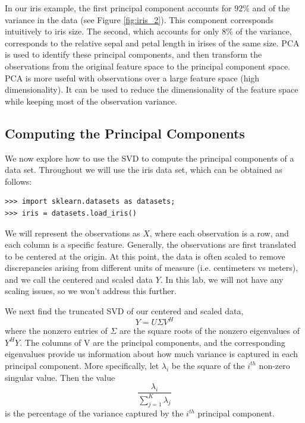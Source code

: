 In our iris example, the first principal component accounts for $92\%$ and of the variance in the data (see Figure \ref{fig:iris_2}). This component corresponds intuitively to iris size. The second, which accounts for only $8\%$ of the variance, corresponds to the relative sepal and petal length in irises of the same size. PCA is used to identify these principal components, and then transform the observations from the original feature space to the principal component space.
PCA is more useful with observations over a large feature space (high dimensionality). It can be used to reduce the dimensionality of the feature space while keeping most of the observation variance.

\subsection*{Computing the Principal Components}
We now explore how to use the SVD to compute the principal components of a data set.
Throughout we will use the iris data set, which can be obtained as follows:
\begin{lstlisting}
>>> import sklearn.datasets as datasets;
>>> iris = datasets.load_iris()
\end{lstlisting}
We will represent the observations as $X$, where each observation is a row, and each column is a specific feature. Generally, the observations are first translated to be centered at the origin. At this point, the data is often scaled to remove discrepancies arising from different units of measure (i.e. centimeters vs meters), and we call the centered and scaled data $Y$. In this lab, we will not have any scaling issues, so we won't address this further.

We next find the truncated SVD of our centered and scaled data,
\[Y = U\Sigma V^{H}\]
where the nonzero entries of $\Sigma$ are the square roots of the nonzero eigenvalues of $Y^{H}Y$. The columns of V are the principal components, and the corresponding eigenvalues provide us information about how much variance is captured in each principal component. More specifically, let $\lambda_{i}$ be the square of the $i^{th}$ non-zero singular value. Then the value
\[\frac{\lambda_{i}}{\sum_{j=1}^{K} \lambda_{j}}\]
is the percentage of the variance captured by the $i^{th}$ principal component.

